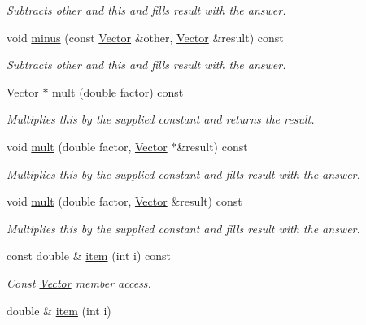 \begin{DoxyCompactItemize}
\begin{DoxyCompactList}\small\item\em Subtracts other and this and fills result with the answer. \end{DoxyCompactList}\item 
void \hyperlink{class_c_a_r_o_m_1_1_vector_aec3233fe859dfd29e47062866cc868fd}{minus} (const \hyperlink{class_c_a_r_o_m_1_1_vector}{Vector} \&other, \hyperlink{class_c_a_r_o_m_1_1_vector}{Vector} \&result) const 
\begin{DoxyCompactList}\small\item\em Subtracts other and this and fills result with the answer. \end{DoxyCompactList}\item 
\hyperlink{class_c_a_r_o_m_1_1_vector}{Vector} $\ast$ \hyperlink{class_c_a_r_o_m_1_1_vector_a5958bc816279be7cc190e4bdfedb4636}{mult} (double factor) const 
\begin{DoxyCompactList}\small\item\em Multiplies this by the supplied constant and returns the result. \end{DoxyCompactList}\item 
void \hyperlink{class_c_a_r_o_m_1_1_vector_aca4960ab196c8064ee85677918e8831b}{mult} (double factor, \hyperlink{class_c_a_r_o_m_1_1_vector}{Vector} $\ast$\&result) const 
\begin{DoxyCompactList}\small\item\em Multiplies this by the supplied constant and fills result with the answer. \end{DoxyCompactList}\item 
void \hyperlink{class_c_a_r_o_m_1_1_vector_aaa151c987af799348656663b930fa491}{mult} (double factor, \hyperlink{class_c_a_r_o_m_1_1_vector}{Vector} \&result) const 
\begin{DoxyCompactList}\small\item\em Multiplies this by the supplied constant and fills result with the answer. \end{DoxyCompactList}\item 
const double \& \hyperlink{class_c_a_r_o_m_1_1_vector_aa03e1dcf3b1572995fadc70562c737d7}{item} (int i) const 
\begin{DoxyCompactList}\small\item\em Const \hyperlink{class_c_a_r_o_m_1_1_vector}{Vector} member access. \end{DoxyCompactList}\item 
double \& \hyperlink{class_c_a_r_o_m_1_1_vector_a1c785725e7de5b533510a96ee163a963}{item} (int i)

\end{DoxyCompactItemize}
